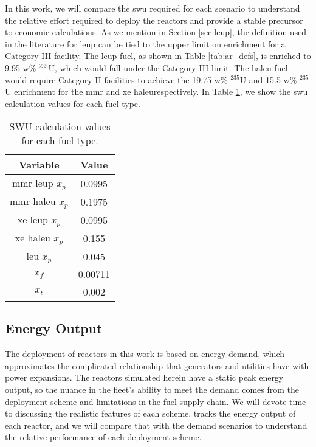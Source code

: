 In this work, we will compare the \gls{swu} required for each scenario to understand the relative effort required to deploy the reactors and provide a stable precursor to economic calculations. As we mention in Section \ref{sec:leup}, the definition used in the literature for \gls{leup} can be tied to the upper limit on enrichment for a Category III facility. The \gls{leup} fuel, as shown in Table \ref{tab:ar_defs}, is enriched to 9.95 w\% $^{235}$U, which would fall under the Category III limit. The \gls{haleu} fuel would require Category II facilities to achieve the 19.75 w\% $^{235}$U and 15.5 w\% $^{235}$U enrichment for the \gls{mmr} and \gls{xe} \gls{haleu}respectively. In Table \ref{tab:swu_vals}, we show the \gls{swu} calculation values for each fuel type.

\begin{table}[H]
    \centering
    \caption{SWU calculation values for each fuel type.}
    \label{tab:swu_vals}
    \begin{tabular}{c c}
        \hline
        \textbf{Variable} & \textbf{Value}\\
        \hline
        \gls{mmr} \gls{leup} $x_p$ & 0.0995\\
        \gls{mmr} \gls{haleu} $x_p$ & 0.1975\\
        \gls{xe} \gls{leup} $x_p$ & 0.0995\\
        \gls{xe} \gls{haleu} $x_p$ & 0.155\\
        \gls{leu} $x_p$ & 0.045\\
        $x_f$ & 0.00711\\
        $x_t$ & 0.002\\
        \hline
    \end{tabular}
\end{table}

\subsection{Energy Output}
\label{sec:energy_output}

The deployment of reactors in this work is based on energy demand, which
approximates the complicated relationship that generators and utilities
have with power expansions. The reactors simulated herein have a static peak energy output, so the nuance in the fleet's ability to meet the demand comes from the deployment scheme and limitations in the fuel supply chain. We will devote time to discussing the realistic features of each scheme. \cyclus tracks the energy output of each reactor, and we will compare that with the demand scenarios to understand the relative performance of each deployment scheme.


